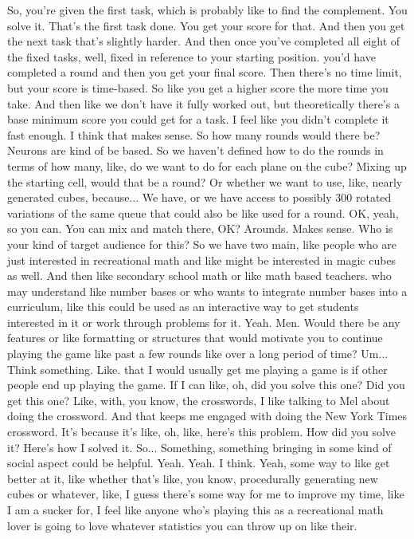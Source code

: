 \documentclass{article}
\begin{document}
So, you're given the first task, which is probably like to find the complement. You solve it. That's the first task done. You get your score for that. And then you get the next task that's slightly harder. And then once you've completed all eight of the fixed tasks, well, fixed in reference to your starting position.
you'd have completed a round and then you get your final score. Then there's no time limit, but your score is time-based. So like you get a higher score the more time you take. And then like we don't have it fully worked out, but theoretically there's a base minimum score you could get for a task.
I feel like you didn't complete it fast enough.
I think that makes sense. So how many rounds would there be?
Neurons are kind of be based.
So we haven't defined how to do the rounds in terms of how many, like, do we want to do for each plane on the cube? Mixing up the starting cell, would that be a round? Or whether we want to use, like, nearly generated cubes, because...
We have, or we have access to possibly 300 rotated variations of the same queue that could also be like used for a round. OK, yeah, so you can.
You can mix and match there, OK?
Arounds.
Makes sense. Who is your kind of target audience for this? So we have two main, like people who are just interested in recreational math and like might be interested in magic cubes as well. And then like secondary school math or like math based teachers.
who may understand like number bases or who wants to integrate number bases into a curriculum, like this could be used as an interactive way to get students interested in it or work through problems for it.
Yeah.
Men.
Would there be any features or like formatting or structures that would motivate you to continue playing the game like past a few rounds like over a long period of time?
Um...
Think something.
Like.
that I would usually get me playing a game is if other people end up playing the game. If I can like, oh, did you solve this one? Did you get this one? Like, with, you know, the crosswords, I like talking to Mel about doing the crossword. And that keeps me engaged with doing the New York Times crossword. It's because it's like, oh, like, here's this problem. How did you solve it? Here's how I solved it.
So...
Something, something bringing in some kind of social aspect could be helpful.
Yeah.
Yeah.
I think.
Yeah, some way to like get better at it, like whether that's like, you know, procedurally generating new cubes or whatever, like, I guess there's some way for me to improve my time, like I am a sucker for, I feel like anyone who's playing this as a recreational math lover is going to love whatever statistics you can throw up on like their.
\end{document}
